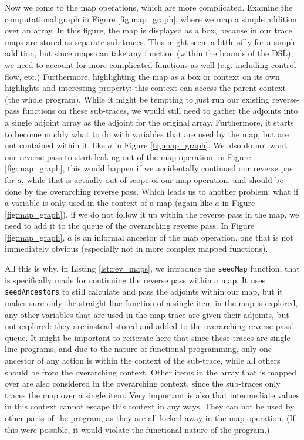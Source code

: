         Now we come to the map operations, which are more complicated.
        Examine the computational graph in Figure \ref{fig:map_graph}, where we map a simple addition over an array.
        In this figure, the map is displayed as a box, because in our trace maps are stored as separate sub-traces.
        This might seem a little silly for a simple addition, but since maps can take any function (within the bounds of the DSL), we need to account for more complicated functions as well (e.g. including control flow, etc.)
        Furthermore, highlighting the map as a box or context on its own highlights and interesting property: this context can access the parent context (the whole program).
        While it might be tempting to just run our existing reverse-pass functions on these sub-traces, we would still need to gather the adjoints into a single adjoint array as the adjoint for the original array.
        Furthermore, it starts to become muddy what to do with variables that are used by the map, but are not contained within it, like $a$ in Figure \ref{fig:map_graph}.
        We also do not want our reverse-pass to start leaking out of the map operation: in Figure \ref{fig:map_graph}, this would happen if we accidentally continued our reverse pas for $a$, while that is actually out of scope of our map operation, and should be done by the overarching reverse pass.
        Which leads us to another problem: what if a variable is only used in the context of a map (again like $a$ in Figure \ref{fig:map_graph}), if we do not follow it up within the reverse pass in the map, we need to add it to the queue of the overarching reverse pass.
        In Figure \ref{fig:map_graph}, $a$ is an informal ancestor of the map operation, one that is not immediately obvious (especially not in more complex mapped functions).
        
        All this is why, in Listing \ref{lst:rev_maps}, we introduce the \texttt{seedMap} function, that is specifically made for continuing the reverse pass within a map.
        It uses \texttt{seedAncestors} to still calculate and pass the adjoints within our map, but it makes sure only the straight-line function of a single item in the map is explored, any other variables that are used in the map trace are given their adjoints, but not explored: they are instead stored and added to the overarching reverse pass' queue.
        It might be important to reiterate here that since these traces are single-line programs, and due to the nature of functional programming, only one ancestor of any action is within the context of the sub-trace, while all others should be from the overarching context.
        Other items in the array that is mapped over are also considered in the overarching context, since the sub-traces only traces the map over a single item.
        Very important is also that intermediate values in this context cannot escape this context in any ways.
        They can not be used by other parts of the program, as they are all locked away in the map operation.
        (If this were possible, it would violate the functional nature of the program.)

